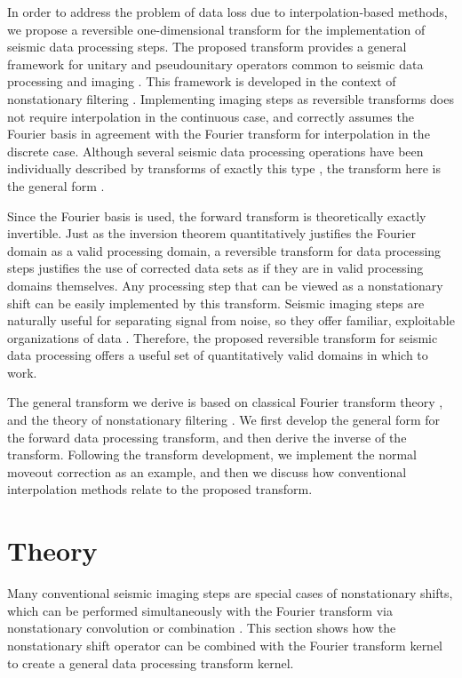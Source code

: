 In order to address the problem of data loss due to interpolation-based methods, we propose a reversible one-dimensional transform for the implementation of seismic data processing steps.  
The proposed transform provides a general framework for unitary and pseudounitary operators common to seismic data processing and imaging \cite{biondi_claerbout85,claerbout92}.  This framework is developed in the context of nonstationary filtering \cite{margrave98}.
Implementing imaging steps as reversible transforms does not require interpolation in the continuous case, and correctly assumes the Fourier basis in agreement with the Fourier transform for interpolation in the discrete case. Although several seismic data processing operations have been individually described by transforms of exactly this type \cite{margrave98,margrave_ferguson99,margrave01,claerbout92}, the transform here is the general form \cite{burnett07,burnett_ferguson08b}.

Since the Fourier basis is used, the forward transform is theoretically exactly invertible.
Just as the inversion theorem quantitatively justifies the Fourier domain as a valid processing domain, a reversible transform for data processing steps justifies the use of corrected data sets as if they are in valid processing domains themselves.
Any processing step that can be viewed as a nonstationary shift can be easily implemented by this transform.
Seismic imaging steps are naturally useful for separating signal from noise, so they offer familiar, exploitable organizations of data \cite{mcmechan_sun91,yu_etal05}.
Therefore, the proposed reversible transform for seismic data processing offers a useful set of quantitatively valid domains in which to work.
 
The general transform we derive is based on classical Fourier transform theory \cite{papoulis62,sneddon95}, and the theory of nonstationary filtering \cite{margrave98}.
We first develop the general form for the forward data processing transform, and then derive the inverse of the transform.  Following the transform development, we implement the normal moveout correction as an example, and then we discuss how conventional interpolation methods relate to the proposed transform.

\section{Theory}
\label{sec:DPTt}
Many conventional seismic imaging steps are special cases of nonstationary shifts, which can be performed simultaneously with the Fourier transform via nonstationary convolution or combination \cite{margrave98}.  This section shows how the nonstationary shift operator can be combined with the Fourier transform kernel to create a general data processing transform kernel.


